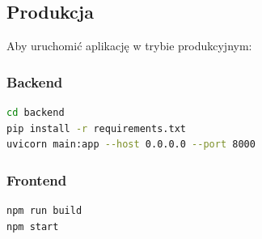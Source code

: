 \documentclass[12pt,a4paper]{article}
\begin{document}
\subsection{Produkcja}

Aby uruchomić aplikację w trybie produkcyjnym:

\subsubsection{Backend}

\begin{lstlisting}[language=bash]
cd backend
pip install -r requirements.txt
uvicorn main:app --host 0.0.0.0 --port 8000
\end{lstlisting}

\subsubsection{Frontend}

\begin{lstlisting}[language=bash]
npm run build
npm start
\end{lstlisting}
\end{document}
